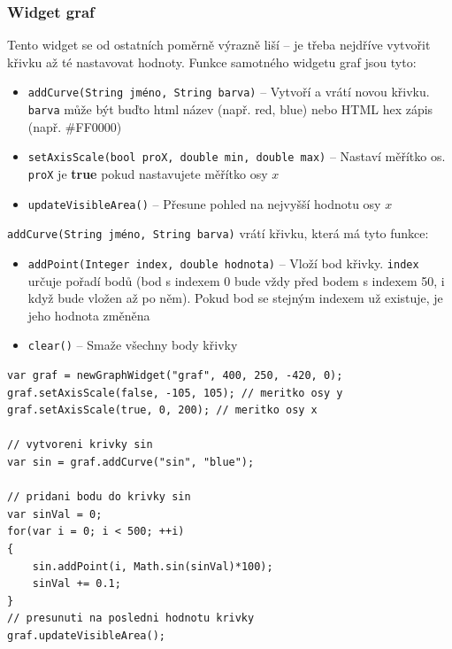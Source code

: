 \documentclass[12pt, a4paper, oneside]{article}
\newcommand{\It}{\textit}  %
\begin{document}
\subsubsection*{Widget graf}
Tento widget se od ostatních poměrně výrazně liší -- je třeba nejdříve vytvořit křivku až té nastavovat hodnoty. Funkce samotného widgetu graf jsou tyto:
\begin{itemize}
    \item {\color{blue}\verb/addCurve(String jméno, String barva)/} -- Vytvoří a vrátí novou křivku. \verb/barva/ může být buďto html název (např. red, blue) nebo HTML hex zápis (např. \#FF0000)
    \item {\color{blue}\verb/setAxisScale(bool proX, double min, double max)/} -- Nastaví měřítko os. \verb/proX/ je {\bf true} pokud nastavujete měřítko osy $x$
    \item {\color{blue}\verb/updateVisibleArea()/} -- Přesune pohled na nejvyšší hodnotu osy $x$
\end{itemize}

{\color{blue}\verb/addCurve(String jméno, String barva)/} vrátí křivku, která má tyto funkce:

\begin{itemize}
    \item {\color{blue}\verb/addPoint(Integer index, double hodnota)/} -- Vloží bod křivky. \verb/index/ určuje pořadí bodů (bod s indexem 0 bude vždy před bodem s indexem 50, i když bude vložen až po něm). Pokud bod se stejným indexem už existuje, je jeho hodnota změněna
    \item {\color{blue}\verb/clear()/} -- Smaže všechny body křivky
\end{itemize}

\noindent\begin{minipage}{\textwidth}
\begin{lstlisting}[caption=Zobrazení křivky funkce sinus ve widgetu \It{graf}]
var graf = newGraphWidget("graf", 400, 250, -420, 0);
graf.setAxisScale(false, -105, 105); // meritko osy y
graf.setAxisScale(true, 0, 200); // meritko osy x

// vytvoreni krivky sin
var sin = graf.addCurve("sin", "blue"); 

// pridani bodu do krivky sin
var sinVal = 0;
for(var i = 0; i < 500; ++i)
{
    sin.addPoint(i, Math.sin(sinVal)*100);
    sinVal += 0.1;
}
// presunuti na posledni hodnotu krivky
graf.updateVisibleArea(); 
\end{lstlisting}
\end{minipage}
\end{document}
